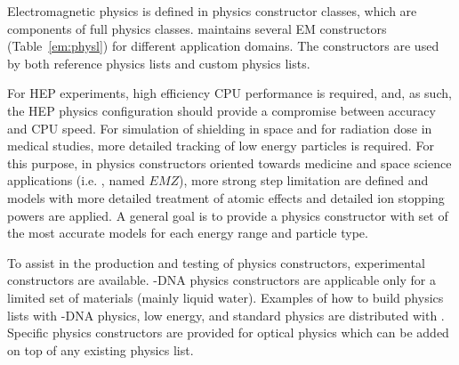 

Electromagnetic physics is defined in physics constructor classes, which are
components of full physics classes. \Gfour{} maintains several EM constructors
(Table~\ref{em:physl}) for different application domains. The constructors are 
used by both \Gfour{} reference physics lists and custom physics lists.

For HEP experiments, high efficiency CPU performance is required, and, as 
such, the HEP physics configuration should provide a compromise between 
accuracy and CPU speed. For simulation of shielding in space and for radiation 
dose in medical studies, more detailed tracking of low energy particles is 
required. For this purpose, in physics constructors oriented towards medicine 
and space science applications 
(i.e. , named $EMZ$), more strong step 
limitation are defined and models with more detailed treatment of atomic 
effects and detailed ion stopping powers are applied. A general goal is to 
provide a physics constructor with set of the most accurate models for each 
energy range and particle type.

To assist in the production and testing of physics constructors, 
experimental constructors are available. 
\Gfour{}-DNA physics constructors are applicable only 
for a limited set of materials (mainly liquid water). Examples 
of how to build physics lists with \Gfour{}-DNA physics, low energy, 
and standard 
physics \cite{embib:uni} are distributed with \Gfour{}. Specific physics 
constructors are provided for optical physics which can be added 
on top of any existing physics list.

